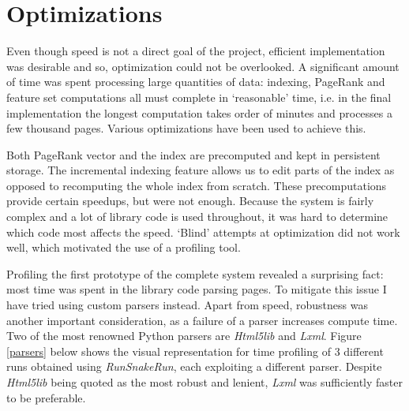 \documentclass[12pt,a4paper,notitlepage,twoside]{scrbook}
\begin{document}
\section{Optimizations}

Even though speed is not a direct goal of the project, efficient implementation
was desirable and so, optimization could not be overlooked. A significant
amount of time was spent processing large quantities of data: indexing, PageRank
and feature set computations all must complete in `reasonable' time, i.e. in the
final implementation the longest computation takes order of minutes and
processes a few thousand pages. Various optimizations have been used to achieve
this. 

Both PageRank vector and the index are precomputed and kept in
persistent storage. The incremental indexing feature allows us to edit parts of the
index as opposed to recomputing the whole index from scratch. These
precomputations provide certain speedups, but were not enough.  Because the
system is fairly complex and a lot of library code is used throughout, it was
hard to determine which code most affects the speed. `Blind' attempts at
optimization did not work well, which motivated the use of a profiling tool.

Profiling the first prototype of the complete system revealed a surprising
fact: most time was spent in the library code parsing pages. To mitigate this
issue I have tried using custom parsers instead. Apart from speed, robustness
was another important consideration, as a failure of a parser increases compute
time. Two of the most renowned Python parsers are \textit{Html5lib} and
\textit{Lxml}. Figure
\ref{parsers} below shows the visual representation for time profiling of 3
different runs obtained using \textit{RunSnakeRun}, each exploiting a
different parser.  Despite \textit{Html5lib} being quoted as the most
robust and lenient, \textit{Lxml} was sufficiently faster to be preferable.
\end{document}
